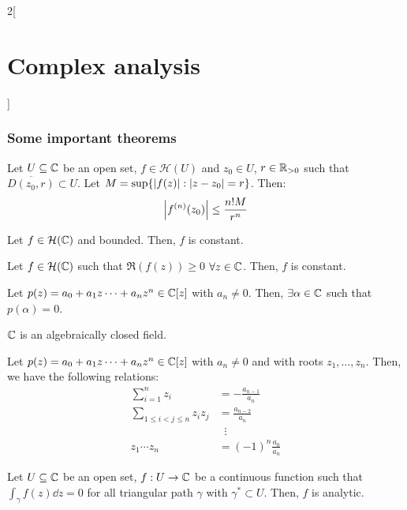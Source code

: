 \documentclass[../../../main_math.tex]{subfiles}
\begin{document}
\begin{multicols}{2}[\section{Complex analysis}]
  \subsubsection{Some important theorems}
  \begin{proposition}
    Let $U\subseteq\mathbb{C}$ be an open set, $f\in\mathcal{H}(U)$ and $z_0\in U$, $r\in\mathbb{R}_{>0}$ such that $\overline{D(z_0,r)}\subset U$. Let $M=\sup\{\abs{f(z)}:\abs{z-z_0}=r\}$. Then:
    $$\abs{f^{(n)}(z_0)}\leq\frac{n!M}{r^n}$$
  \end{proposition}
  \begin{theorem}
    Let $f\in\mathcal{H}(\mathbb{C})$ and bounded. Then, $f$ is constant.
  \end{theorem}
  \begin{corollary}
    Let $f\in\mathcal{H}(\mathbb{C})$ such that $\Re(f(z))\geq 0$ $\forall z\in\mathbb{C}$. Then, $f$ is constant.
  \end{corollary}
  \begin{theorem}
    Let $p(z)=a_0+a_1z\cdots+a_nz^n\in\mathbb{C}[z]$ with $a_n\ne 0$. Then, $\exists \alpha\in \mathbb{C}$ such that $p(\alpha)=0$.
  \end{theorem}
  \begin{corollary}
    $\mathbb{C}$ is an algebraically closed field.
  \end{corollary}
  \begin{proposition}
    Let $p(z)=a_0+a_1z\cdots+a_nz^n\in\mathbb{C}[z]$ with $a_n\ne 0$ and with roots $z_1,\ldots,z_n$. Then, we have the following relations:
    \begin{align*}
      \sum_{i=1}^nz_i              & =                    -\frac{a_{n-1}}{a_n}  \\
      \sum_{1\leq i<j\leq n}z_iz_j & =  \frac{a_{n-2}}{a_n}                     \\
                                   & \;\;\vdots                                 \\
      z_1\cdots z_n                & =                  {(-1)}^n\frac{a_0}{a_n}
    \end{align*}
  \end{proposition}
  \begin{theorem}
    Let $U\subseteq\mathbb{C}$ be an open set, $f:U\rightarrow\mathbb{C}$ be a continuous function such that $\displaystyle \int_\gamma f(z)\dd{z}=0$ for all triangular path $\gamma$ with $\gamma^*\subset U$. Then, $f$ is analytic.
  \end{theorem}

\end{multicols}
\end{document}
